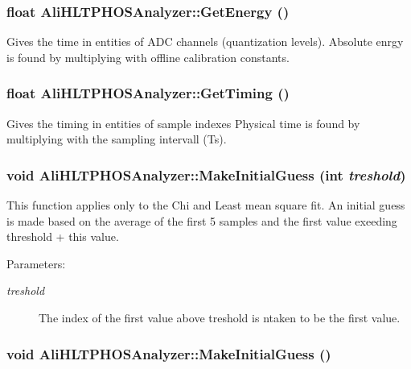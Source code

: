 \subsubsection{\setlength{\rightskip}{0pt plus 5cm}float Ali\-HLTPHOSAnalyzer::Get\-Energy ()}\label{classAliHLTPHOSAnalyzer_a9}


Gives the time in entities of ADC channels (quantization levels). Absolute enrgy is found by multiplying with offline calibration constants. 
\subsubsection{\setlength{\rightskip}{0pt plus 5cm}float Ali\-HLTPHOSAnalyzer::Get\-Timing ()}\label{classAliHLTPHOSAnalyzer_a8}


Gives the timing in entities of sample indexes Physical time is found by multiplying with the sampling intervall (Ts). 
\subsubsection{\setlength{\rightskip}{0pt plus 5cm}void Ali\-HLTPHOSAnalyzer::Make\-Initial\-Guess (int {\em treshold})}\label{classAliHLTPHOSAnalyzer_a13}


This function applies only to the Chi and Least mean square fit. An initial guess is made based on the average of the first 5 samples and the first value exeeding threshold + this value. \begin{Desc}
\item[Parameters:]
\begin{description}
\item[{\em treshold}]The index of the first value above treshold is ntaken to be the first value. \end{description}
\end{Desc}
\subsubsection{\setlength{\rightskip}{0pt plus 5cm}void Ali\-HLTPHOSAnalyzer::Make\-Initial\-Guess ()}\label{classAliHLTPHOSAnalyzer_a12}


